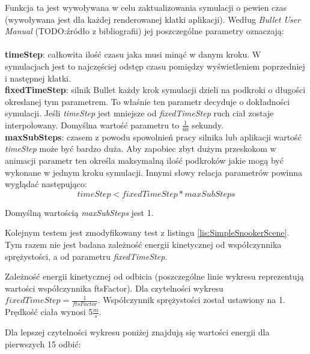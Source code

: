Funkcja ta jest wywoływana w celu zaktualizowania symulacji o pewien
czas (wywoływana jest dla każdej renderowanej klatki aplikacji). Według
\emph{Bullet User Manual} (TODO:źródło z bibliografii) jej poszczególne
parametry oznaczają:\\
\\
\textbf{timeStep}: całkowita ilość czasu jaka musi minąć w danym kroku. W
symulacjach jest to najczęściej odstęp czasu pomiędzy wyświetleniem poprzedniej
i następnej klatki.\\
\textbf{fixedTimeStep}: silnik Bullet każdy krok symulacji dzieli na podkroki o
długości okreslanej tym parametrem. To właśnie ten parametr decyduje o
dokładności symulacji. Jeśli \emph{timeStep} jest mniejsze od
\emph{fixedTimeStep} ruch ciał zostaje interpolowany. Domyślna wartość parametru
to $ \frac{1}{60} $ sekundy.\\
\textbf{maxSubSteps}: czasem z powodu spowolnień pracy silnika lub aplikacji
wartość \emph{timeStep} może być bardzo duża. Aby zapobiec zbyt dużym przeskokom
w animacji parametr ten określa maksymalną ilość podkroków jakie mogą być
wykonane w jednym kroku symulacji. Innymi słowy relacja parametrów powinna
wyglądać następująco:\\
\begin{equation}
timeStep < fixedTimeStep * maxSubSteps
\end{equation}

Domyślną wartością \emph{maxSubSteps} jest 1.

Kolejnym testem jest zmodyfikowany test z listingu \ref{lis:SimpleSnookerScene}.
Tym razem nie jest badana zależność energii kinetycznej od współczynnika
sprężystości, a od parametru \emph{fixedTimeStep}. 



Zależność energii kinetycznej od odbicia (poszczególne linie wykresu
reprezentują wartości współczynnika ftsFactor). Dla czytelności wykresu $
fixedTimeStep = \frac{1}{ftsFactor} $. Współczynnik sprężystości został
ustawiony na 1. Prędkość ciała wynosi 5$\frac{m}{s}$.



Dla lepszej czytelności wykresu poniżej znajdują się wartości energii dla
pierwszych 15 odbić:



